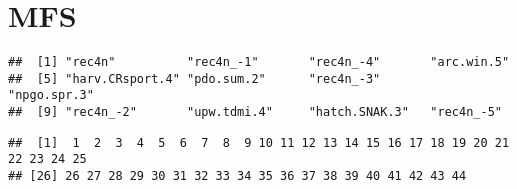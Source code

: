 \documentclass[
]{article}
\newenvironment{Shaded}{\begin{snugshade}}{\end{snugshade}}
\newcommand{\FunctionTok}[1]{\textcolor[rgb]{0.00,0.00,0.00}{#1}}
\newcommand{\NormalTok}[1]{#1}
\newcommand{\SpecialCharTok}[1]{\textcolor[rgb]{0.00,0.00,0.00}{#1}}
\begin{document}
\hypertarget{mfs}{%
\section{MFS}\label{mfs}}

\begin{Shaded}
\end{Shaded}

\begin{verbatim}
##  [1] "rec4n"          "rec4n_-1"       "rec4n_-4"       "arc.win.5"     
##  [5] "harv.CRsport.4" "pdo.sum.2"      "rec4n_-3"       "npgo.spr.3"    
##  [9] "rec4n_-2"       "upw.tdmi.4"     "hatch.SNAK.3"   "rec4n_-5"
\end{verbatim}

\begin{Shaded}
\end{Shaded}

\begin{verbatim}
##  [1]  1  2  3  4  5  6  7  8  9 10 11 12 13 14 15 16 17 18 19 20 21 22 23 24 25
## [26] 26 27 28 29 30 31 32 33 34 35 36 37 38 39 40 41 42 43 44
\end{verbatim}
\end{document}
